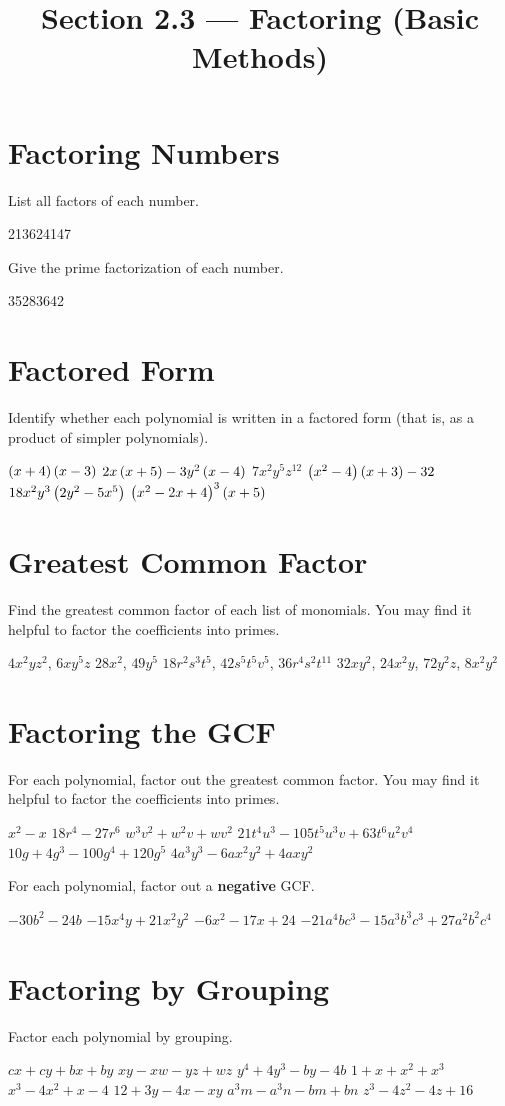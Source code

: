

\title{Section 2.3 --- Factoring (Basic Methods)}


\maketitle
\section*{Factoring Numbers}
List all factors of each number.
\begin{smenum}
\mitemxxxx
{21}{36}{24}{147}
\end{smenum}
Give the prime factorization of each number.
\begin{smenum}
\mitemxxxx
{35}{28}{36}{42}
\end{smenum}

\section*{Factored Form}
Identify whether each polynomial is written in a factored form (that is, as a product of simpler polynomials).
\begin{smenum}
\mitemxxx
{$\left(x+4\right)\left(x-3\right)$}
{$2x\left(x+5\right)-3y^2\left(x-4\right)$}
{$7x^2y^5z^{12}$}
\mitemxxx
{$\left(x^2-4\right)\left(x+3\right)-32$}
{$18x^2y^3\left(2y^2-5x^5\right)$}
{$\left(x^2-2x+4\right)^3\left(x+5\right)$}
\end{smenum}

\section*{Greatest Common Factor}
Find the greatest common factor of each list of monomials.  You may find it helpful to factor the coefficients into primes.
\begin{smenum}
\mitemxxx
{$4x^2yz^2$, $6xy^5z$}
{$28x^2$, $49y^5$}
{$18r^2s^3t^5$, $42s^5t^5v^5$, $36r^4s^2t^{11}$}
\mitemx
{$32xy^2$, $24x^2y$, $72y^2z$, $8x^2y^2$}
\end{smenum}

\section*{Factoring the GCF}
For each polynomial, factor out the greatest common factor.  You may find it helpful to factor the coefficients into primes.
\begin{smenum}
\mitemxx
{$x^2-x$}
{$18r^4-27r^6$}
\mitemxx
{$w^3v^2+w^2v+wv^2$}
{$21t^4u^3-105t^5u^3v+63t^6u^2v^4$}
\mitemxx
{$10g+4g^3-100g^4+120g^5$}
{$4a^3y^3-6ax^2y^2+4axy^2$}
\end{smenum}
For each polynomial, factor out a \textbf{negative} GCF.
\begin{smenum}
\mitemxx
{$-30b^2-24b$}
{$-15x^4y+21x^2y^2$}
\mitemxx
{$-6x^2-17x+24$}
{$-21a^4bc^3-15a^3b^3c^3+27a^2b^2c^4$}
\end{smenum}

\section*{Factoring by Grouping}
Factor each polynomial by grouping.
\begin{smenum}
\mitemxxxx
{$cx+cy+bx+by$}
{$xy-xw-yz+wz$}
{$y^4+4y^3-by-4b$}
{$1+x+x^2+x^3$}
\mitemxxxx
{$x^3-4x^2+x-4$}
{$12+3y-4x-xy$}
{$a^3m-a^3n-bm+bn$}
{$z^3-4z^2-4z+16$}
\end{smenum}

